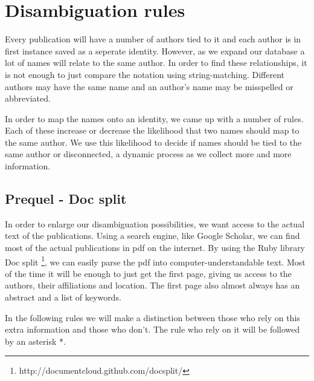 \section{Disambiguation rules}

Every publication will have a number of authors tied to it and each author is in first instance saved as a seperate identity. However, as we expand our database a lot of names will relate to the same author. In order to find these relationships, it is not enough to just compare the notation using string-matching. Different authors may have the same name and an author's name may be misspelled or abbreviated.

In order to map the names onto an identity, we came up with a number of rules. Each of these increase or decrease the likelihood that two names should map to the same author. We use this likelihood to decide if names should be tied to the same author or disconnected, a dynamic process as we collect more and more information.


\subsection{Prequel - Doc split}

In order to enlarge our disambiguation possibilities, we want access to the actual text of the publications. Using a search engine, like Google Scholar, we can find most of the actual publications in pdf on the internet. By using the Ruby library Doc split \footnote{http://documentcloud.github.com/docsplit/}, we can easily parse the pdf into computer-understandable text. Most of the time it will be enough to just get the first page, giving us access to the authors, their affiliations and location. The first page also almost always has an abstract and a list of keywords.

In the following rules we will make a distinction between those who rely on this extra information and those who don't. The rule who rely on it will be followed by an asterisk *.

